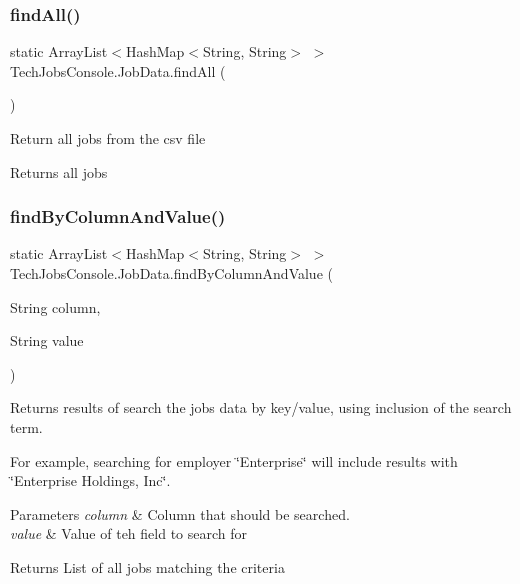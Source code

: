 \subsubsection{\texorpdfstring{findAll()}{findAll()}\hspace{0.1cm}{\footnotesize\ttfamily [2/2]}}
{\footnotesize\ttfamily static Array\+List$<$Hash\+Map$<$String, String$>$ $>$ Tech\+Jobs\+Console.\+Job\+Data.\+find\+All (\begin{DoxyParamCaption}{ }\end{DoxyParamCaption})\hspace{0.3cm}{\ttfamily [static]}}

Return all jobs from the csv file \begin{DoxyReturn}{Returns}
all jobs 
\end{DoxyReturn}
\mbox{\label{class_tech_jobs_console_1_1_job_data_a46bd0cdccbf24af87e20580ed6f1af37}} 
\subsubsection{\texorpdfstring{findByColumnAndValue()}{findByColumnAndValue()}}
{\footnotesize\ttfamily static Array\+List$<$Hash\+Map$<$String, String$>$ $>$ Tech\+Jobs\+Console.\+Job\+Data.\+find\+By\+Column\+And\+Value (\begin{DoxyParamCaption}\item[{String}]{column,  }\item[{String}]{value }\end{DoxyParamCaption})\hspace{0.3cm}{\ttfamily [static]}}

Returns results of search the jobs data by key/value, using inclusion of the search term.

For example, searching for employer \char`\"{}\+Enterprise\char`\"{} will include results with \char`\"{}\+Enterprise Holdings, Inc\char`\"{}.


\begin{DoxyParams}{Parameters}
{\em column} & Column that should be searched. \\
\hline
{\em value} & Value of teh field to search for \\
\hline
\end{DoxyParams}
\begin{DoxyReturn}{Returns}
List of all jobs matching the criteria 
\end{DoxyReturn}
\mbox{\label{class_tech_jobs_console_1_1_job_data_a8d47da2c067369c27e02b4d769cb1739}} 
